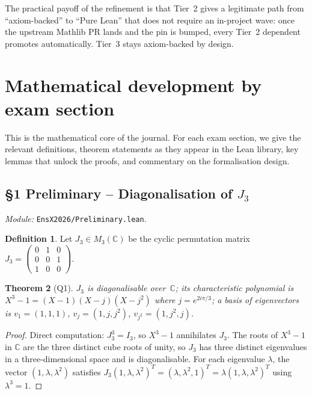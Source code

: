 \documentclass[11pt,a4paper]{article}
\newcommand{\lmod}[1]{\texttt{\small #1}}
\newcommand{\C}{\mathbb{C}}
\theoremstyle{plain}
\newtheorem{theorem}{Theorem}[section]
\theoremstyle{definition}
\newtheorem{definition}[theorem]{Definition}
\begin{document}
\noindent
The practical payoff of the refinement is that Tier~2 gives a
legitimate path from ``axiom-backed'' to ``Pure Lean'' that does not
require an in-project wave: once the upstream Mathlib PR lands and the
pin is bumped, every Tier~2 dependent promotes automatically. Tier~3
stays axiom-backed by design.

\section{Mathematical development by exam section}\label{sec:math}

This is the mathematical core of the journal. For each exam section, we
give the relevant definitions, theorem statements as they appear in
the Lean library, key lemmas that unlock the proofs, and commentary on
the formalisation design.

\subsection{\S1 Preliminary -- Diagonalisation of \texorpdfstring{$J_3$}{J3}}
\emph{Module:} \lmod{EnsX2026/Preliminary.lean}.

\begin{definition}
Let $J_3 \in M_3(\C)$ be the cyclic permutation matrix
$J_3 = \begin{pmatrix}0&1&0\\0&0&1\\1&0&0\end{pmatrix}$.
\end{definition}

\begin{theorem}[Q1]
$J_3$ is diagonalisable over~$\C$; its characteristic polynomial is
$X^3 - 1 = (X-1)(X-j)(X-j^2)$ where $j = e^{2i\pi/3}$; a basis of
eigenvectors is $v_1 = (1,1,1)$, $v_j = (1, j, j^2)$,
$v_{j^2} = (1, j^2, j)$.
\end{theorem}

\begin{proof}
Direct computation: $J_3^3 = I_3$, so $X^3 - 1$ annihilates $J_3$. The
roots of $X^3 - 1$ in $\C$ are the three distinct cube roots of unity,
so $J_3$ has three distinct eigenvalues in a three-dimensional space
and is diagonalisable. For each eigenvalue $\lambda$, the vector
$(1, \lambda, \lambda^2)$ satisfies $J_3 (1, \lambda, \lambda^2)^T
= (\lambda, \lambda^2, 1)^T = \lambda (1, \lambda, \lambda^2)^T$ using
$\lambda^3 = 1$.
\end{proof}
\end{document}
